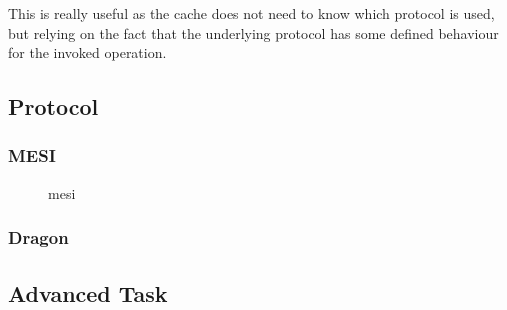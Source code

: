 This is really useful as the cache does not need to know which protocol is used, but relying on the fact that the underlying protocol has some defined behaviour for the invoked operation.



\subsection{Protocol}

\subsubsection{MESI}

\begin{figure}[ht]
    \centering
    \caption{mesi}
    \label{fig:mesi}
\end{figure}

\subsubsection{Dragon}

\subsection{Advanced Task}
